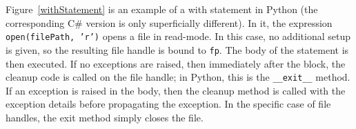 \documentclass[11pt]{article}
\begin{document}

%
%
%    
%





Figure~\ref{withStatement} is an example of a with statement in Python (the corresponding C\# version is only superficially different).
In it, the expression \texttt{open(filePath, 'r')} opens a file in read-mode.
In this case, no additional setup is given, so the resulting file handle is bound to \texttt{fp}.
The body of the statement is then executed.
If no exceptions are raised, then immediately after the block, the cleanup code is called on the file handle; in Python, this is the \texttt{\_\_exit\_\_} method.
If an exception is raised in the body, then the cleanup method is called with the exception details before propagating the exception.
In the specific case of file handles, the exit method simply closes the file.
\end{document}
